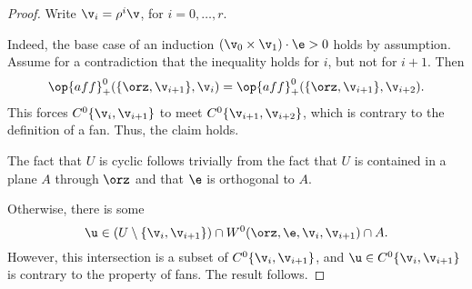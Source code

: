 \begin{proof} 
Write $\v_i = \rho^i \v$, for $i=0,\ldots,r$.

Indeed, the base case of an induction $(\v_0\times \v_1)\cdot \e > 0$
holds by assumption.  Assume for a contradiction that the inequality
holds for $i$, but not for $i+1$.  Then
\begin{displaymath}
  \op{aff}^0_+(\{\orz,\v_{i+1}\},\v_i) 
= \op{aff}^0_+(\{\orz,\v_{i+1}\},\v_{i+2}).
\end{displaymath} 
This forces $C^0\{\v_i,\v_{i+1}\}$ to meet $C^0\{\v_{i+1},\v_{i+2}\}$,
which is contrary to the definition of a fan.  Thus, the claim holds.

The fact that $U$ is cyclic follows trivially from the fact that $U$
is contained in a plane $A$ through $\orz$ and that $\e$ is orthogonal
to $A$.

Otherwise, there is some 
\begin{displaymath}
  \u \in (U\setminus \{\v_i,\v_{i+1}\}) 
\cap W^0(\orz,\e,\v_i,\v_{i+1}) \cap A.
\end{displaymath}
However, this intersection is a subset of $C^0\{\v_i,\v_{i+1}\}$, and
$\u\in C^0\{\v_i,\v_{i+1}\}$ is contrary to the property
 of fans.  The result follows.
\end{proof}

